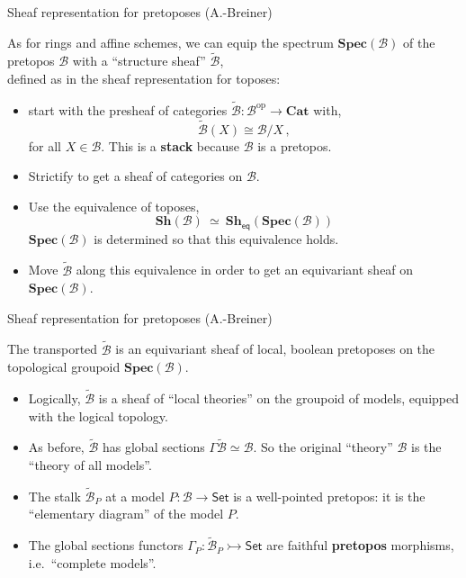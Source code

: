 \documentclass{beamer}
\newcommand{\B}{\ensuremath{\mathcal{B}}}
\newcommand{\myemph}[1]{\textbf{#1}}    %
\newcommand{\Set}{\mathsf{Set}}
\begin{document}
\begin{frame}{Sheaf representation for pretoposes (A.-Breiner)}

As for rings and affine schemes, we can equip the spectrum $\mathbf{Spec}(\mathcal{B})$ of the pretopos $\mathcal{B}$ with a ``structure sheaf'' $\tilde{\mathcal{B}}$,\\
  defined as in the sheaf representation for toposes: 
\begin{itemize}
\item start with the presheaf of categories $\tilde{\mathcal{B}} : \mathcal{B}^{\mathrm{op}}\to\mathbf{Cat}$ with,
\[
\tilde{\mathcal{B}}(X) \cong \mathcal{B}/X\,,
\]
for all $X\in \B$. This is a \myemph{stack} because $\mathcal{B}$ is a pretopos.
 
\item Strictify to get a sheaf of categories on $\mathcal{B}$. 

\item Use the equivalence of toposes,
\[
\mathbf{Sh}(\B)\ \simeq\ \mathbf{Sh}_{\mathsf{eq}}(\mathbf{Spec}(\mathcal{B}))
\]
$\mathbf{Spec}(\mathcal{B})$ is determined so that this equivalence holds.

\item Move $\tilde{\mathcal{B}}$ along this equivalence in order to get an equivariant sheaf on $\mathbf{Spec}(\mathcal{B})$.
\end{itemize}

\end{frame}
\begin{frame}{Sheaf representation for pretoposes (A.-Breiner)}

The transported $\tilde{\mathcal{B}}$  is an equivariant sheaf of local, boolean pretoposes on the topological groupoid $\mathbf{Spec}(\mathcal{B})$.

\begin{itemize}
\item Logically, $\tilde{\mathcal{B}}$ is a sheaf of ``local theories'' on the groupoid of models, equipped with the logical topology.  

\item As before, $\tilde{\mathcal{B}}$ has global sections $\Gamma\tilde{\mathcal{B}} \simeq \mathcal{B}$.  So the original ``theory'' $\mathcal{B}$ is the ``theory of all models''.

\item The stalk $\tilde{\mathcal{B}}_P$ at a model $P : \mathcal{B} \to \Set$ is a well-pointed pretopos: it is the ``elementary diagram'' of the model $P$.
\medskip

\item The global sections functors $\Gamma_P : \tilde{\mathcal{B}}_P \rightarrowtail \Set$ are faithful \myemph{pretopos} morphisms, i.e.\ ``complete models''.

\end{itemize}
\end{frame}
\end{document}
